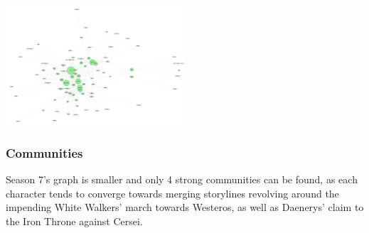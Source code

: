 \documentclass[10pt,twocolumn,letterpaper]{article}
\begin{document}
\begin{center}
    \includegraphics[width=0.5\textwidth]{img/s7/pagerank_graph.jpg}
\end{center}

\subsubsection{Communities}

Season 7's graph is smaller and only 4 strong communities can be found, as each character tends to converge towards merging storylines revolving around the impending White Walkers' march towards Westeros, as well as Daenerys' claim to the Iron Throne against Cersei.
\end{document}

